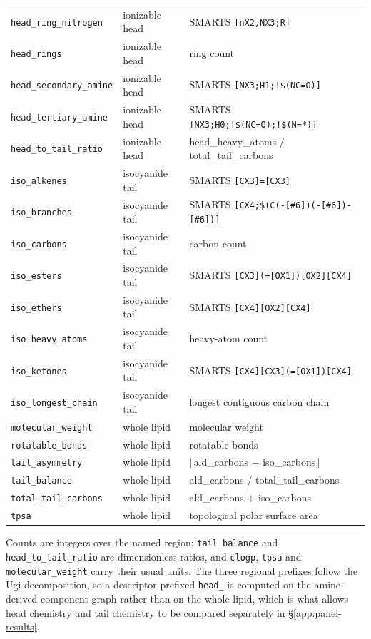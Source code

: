 \documentclass{article}
\begin{document}
\begin{longtable}{@{}p{4.0cm}p{2.6cm}p{6.2cm}@{}}
\texttt{head\_ring\_nitrogen} & ionizable head & SMARTS \texttt{[nX2,NX3;R]} \\
\texttt{head\_rings} & ionizable head & ring count \\
\texttt{head\_secondary\_amine} & ionizable head & SMARTS \texttt{[NX3;H1;!\$(NC=O)]} \\
\texttt{head\_tertiary\_amine} & ionizable head & SMARTS \texttt{[NX3;H0;!\$(NC=O);!\$(N=*)]} \\
\texttt{head\_to\_tail\_ratio} & ionizable head & head\_heavy\_atoms / total\_tail\_carbons \\
\texttt{iso\_alkenes} & isocyanide tail & SMARTS \texttt{[CX3]=[CX3]} \\
\texttt{iso\_branches} & isocyanide tail & SMARTS \texttt{[CX4;\$(C(-[\#6])(-[\#6])-[\#6])]} \\
\texttt{iso\_carbons} & isocyanide tail & carbon count \\
\texttt{iso\_esters} & isocyanide tail & SMARTS \texttt{[CX3](=[OX1])[OX2][CX4]} \\
\texttt{iso\_ethers} & isocyanide tail & SMARTS \texttt{[CX4][OX2][CX4]} \\
\texttt{iso\_heavy\_atoms} & isocyanide tail & heavy-atom count \\
\texttt{iso\_ketones} & isocyanide tail & SMARTS \texttt{[CX4][CX3](=[OX1])[CX4]} \\
\texttt{iso\_longest\_chain} & isocyanide tail & longest contiguous carbon chain \\
\texttt{molecular\_weight} & whole lipid & molecular weight \\
\texttt{rotatable\_bonds} & whole lipid & rotatable bonds \\
\texttt{tail\_asymmetry} & whole lipid & $|\,$ald\_carbons $-$ iso\_carbons$\,|$ \\
\texttt{tail\_balance} & whole lipid & ald\_carbons / total\_tail\_carbons \\
\texttt{total\_tail\_carbons} & whole lipid & ald\_carbons $+$ iso\_carbons \\
\texttt{tpsa} & whole lipid & topological polar surface area \\
\end{longtable}
\endgroup

Counts are integers over the named region; \texttt{tail\_balance} and
\texttt{head\_to\_tail\_ratio} are dimensionless ratios, and \texttt{clogp}, \texttt{tpsa} and
\texttt{molecular\_weight} carry their usual units. The three regional prefixes follow the Ugi
decomposition, so a descriptor prefixed \texttt{head\_} is computed on the amine-derived component
graph rather than on the whole lipid, which is what allows head chemistry and tail chemistry to be
compared separately in \S\ref{app:panel-results}.
\end{document}
